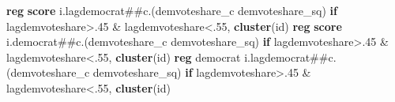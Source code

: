 \documentclass[
]{book}
\newenvironment{Shaded}{\begin{snugshade}}{\end{snugshade}}
\newcommand{\KeywordTok}[1]{\textcolor[rgb]{0.13,0.29,0.53}{\textbf{#1}}}
\newcommand{\NormalTok}[1]{#1}
\begin{document}
\begin{Shaded}
\begin{Highlighting}[]
\KeywordTok{reg} \KeywordTok{score}\NormalTok{ i.lagdemocrat\#\#c.(demvoteshare\_c demvoteshare\_sq) }\KeywordTok{if}\NormalTok{ lagdemvoteshare\textgreater{}.45 \& lagdemvoteshare\textless{}.55, }\KeywordTok{cluster}\NormalTok{(id)}
\KeywordTok{reg} \KeywordTok{score}\NormalTok{ i.democrat\#\#c.(demvoteshare\_c demvoteshare\_sq) }\KeywordTok{if}\NormalTok{ lagdemvoteshare\textgreater{}.45 \& lagdemvoteshare\textless{}.55, }\KeywordTok{cluster}\NormalTok{(id)}
\KeywordTok{reg}\NormalTok{ democrat i.lagdemocrat\#\#c.(demvoteshare\_c demvoteshare\_sq) }\KeywordTok{if}\NormalTok{ lagdemvoteshare\textgreater{}.45 \& lagdemvoteshare\textless{}.55, }\KeywordTok{cluster}\NormalTok{(id)}
\end{Highlighting}
\end{Shaded}
\end{document}
